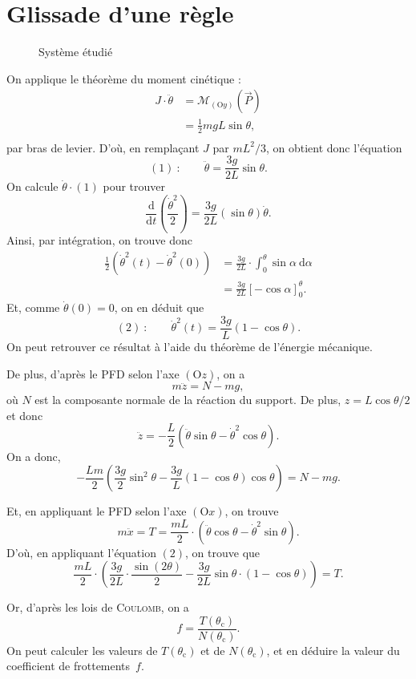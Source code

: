 \section{Glissade d'une règle}

\begin{figure}[H]
	\centering
	
	\caption{Système étudié}
\end{figure}

On applique le théorème du moment cinétique :
\begin{align*}
	J \cdot \ddot{\theta} &= \mathcal{M}_{(\mathrm{O}y)}(\vec{P})\\
	&= \frac{1}{2}mgL \sin \theta, \\
\end{align*}
par bras de levier.
D'où, en remplaçant $J$ par $m L^2 / 3$, on obtient donc l'équation \[
	(1) \ : \quad\quad \ddot{\theta} = \frac{3g}{2L} \sin \theta
.\]
On calcule $\dot{\theta} \cdot (1)$ pour trouver \[
	\frac{\mathrm{d}}{\mathrm{d}t} \left( \frac{\dot{\theta}^2}{2} \right) = \frac{3g}{2L} (\sin \theta) \dot{\theta}
.\]
Ainsi, par intégration, on trouve donc
\begin{align*}
	\frac{1}{2} \left( \dot{\theta}^2(t) - \dot{\theta}^2(0) \right) &= \frac{3g}{2L} \cdot \int_{0}^{\theta} \sin \alpha~\mathrm{d}\alpha\\
	&= \frac{3g}{2L} [-\cos \alpha]_0^\theta .
\end{align*}
Et, comme $\dot{\theta}(0) = 0$, on en déduit que \[
	(2)\ : \quad\quad\dot{\theta}^2(t) = \frac{3g}{L} \left( 1 - \cos \theta \right)
.\]
On peut retrouver ce résultat à l'aide du théorème de l'énergie mécanique.

De plus, d'après le PFD selon l'axe $(\mathrm{O}z)$, on a \[
	m \ddot{z} = N - mg
,\] où $N$ est la composante normale de la réaction du support.
De plus, $z = L \cos \theta / 2$ et donc \[
	\ddot{z} = - \frac{L}{2} \left( \ddot{\theta} \sin \theta - \dot{\theta}^2 \cos \theta \right)
.\]
On a donc, \[
	- \frac{Lm}{2} \left( \frac{3g}{2} \sin^2 \theta - \frac{3g}{L} (1 - \cos \theta) \cos \theta \right) = N - mg
.\]

Et, en appliquant le PFD selon l'axe $(\mathrm{O}x)$, on trouve \[
	m \ddot{x} = T = \frac{mL}{2} \cdot \left( \ddot{\theta} \cos \theta - \dot{\theta}^2 \sin \theta \right)
.\]
D'où, en appliquant l'équation $(2)$, on trouve que \[
	\frac{mL}{2} \cdot \left( \frac{3g}{2L} \cdot \frac{\sin(2\theta)}{2} - \frac{3g}{2L}\sin \theta  \cdot (1 - \cos \theta) \right) = T
.\]

Or, d'après les lois de \textsc{Coulomb}, on a \[
	f = \frac{T(\theta_\mathrm{c})}{N(\theta_\mathrm{c})}
.\]
On peut calculer les valeurs de $T(\theta_\mathrm{c})$ et de $N(\theta_\mathrm{c})$, et en déduire la valeur du coefficient de frottements~$f$.
